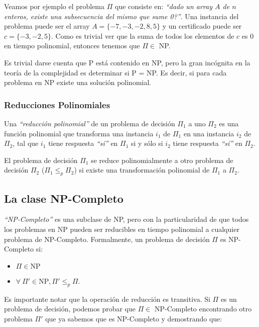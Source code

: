 Veamos por ejemplo el problema $\Pi$ que consiste en: \emph{``dado un array $A$ de $n$ enteros, existe una subsecuencia del mismo que sume 0?''}. Una instancia del problema puede ser el array $A = \{-7, -3, -2, 8, 5\}$ y un certificado puede ser $c = \{-3, -2, 5\}$. Como es trivial ver que la suma de todos los elementos de $c$ es $0$ en tiempo polinomial, entonces tenemos que $\Pi \in$ NP.

Es trivial darse cuenta que P est\'a contenido en NP, pero la gran inc\'ognita en la teor\'ia de la complejidad es determinar si P = NP. Es decir, si para cada problema en NP existe una soluci\'on polinomial.


\subsubsection{Reducciones Polinomiales}

Una \emph{``reducci\'on polinomial''} de un problema de decisi\'on $\Pi_1$ a uno $\Pi_2$ es una funci\'on polinomial que transforma una instancia  $i_1$ de $\Pi_1$ en una instancia $i_2$ de $\Pi_2$, tal que $i_1$ tiene respuesta \emph{``s\'i''} en $\Pi_1$ si y s\'olo si $i_2$ tiene respuesta \emph{``s\'i''} en $\Pi_2$.

El problema de decisi\'on $\Pi_1$ se reduce polinomialmente a otro problema de decisi\'on $\Pi_2$ ($\Pi_1 \leq_p \Pi_2$) si existe una transformaci\'on polinomial de $\Pi_1$ a $\Pi_2$.

\subsection{La clase NP-Completo}

\emph{``NP-Completo''} es una subclase de NP, pero con la particularidad de que todos los problemas en NP pueden ser reducibles en tiempo polinomial a cualquier problema de NP-Completo. Formalmente, un problema de decisi\'on $\Pi$ es NP-Completo si:

\begin{itemize}
\item $\Pi \in \textrm{NP}$
\item $\forall\ \Pi' \in \textrm{NP}, \Pi' \leq_p \Pi$.
\end{itemize} 

Es importante notar que la operaci\'on de reducci\'on es transitiva. Si $\Pi$ es un problema de decisi\'on, podemos probar que $\Pi \in$ NP-Completo encontrando otro problema $\Pi'$ que ya sabemos que es NP-Completo y demostrando que:

